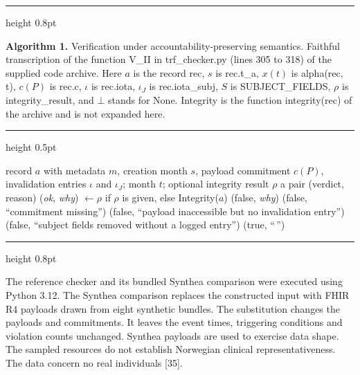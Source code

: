 \documentclass[5p,twocolumn]{elsarticle}
\newcommand{\algcapfont}{\footnotesize\linespread{1.05}\selectfont}
\begin{document}
\begin{algorithm*}[!tbp]
\captionsetup{justification=raggedright,singlelinecheck=false}
\hrule height 0.8pt\vspace{3pt}
{\algcapfont\raggedright \textbf{Algorithm 1.} Verification under accountability-preserving
semantics. Faithful transcription of the function V\_II in
trf\_checker.py (lines 305 to 318) of the supplied code archive. Here
\(a\) is the record rec, \(s\) is rec.t\_a, \(x(t)\) is alpha(rec, t),
\(c(P)\) is rec.c, \(\iota\) is rec.iota, \(\iota_J\) is rec.iota\_subj,
\(S\) is SUBJECT\_FIELDS, \(\rho\) is integrity\_result, and \(\bot\)
stands for None. Integrity is the function integrity(rec) of the archive
and is not expanded here.\par}
\vspace{2pt}\hrule height 0.5pt\vspace{3pt}
\small\linespread{1.05}\selectfont\begin{algorithmic}[1]
\Require record \(a\) with metadata \(m\), creation month \(s\), payload commitment \(c(P)\), invalidation entries \(\iota\) and \(\iota_J\); month \(t\); optional integrity result \(\rho\)
\Ensure a pair (verdict, reason)
\State (\emph{ok}, \emph{why}) \(\leftarrow \rho\) if \(\rho\) is given, else Integrity(\(a\))
\State \Return (false, \emph{why})
\EndIf
{}
\State \Return (false, ``commitment missing'')
\EndIf
{}
\State \Return (false, ``payload inaccessible but no invalidation entry'')
\EndIf
{}
\State \Return (false, ``subject fields removed without a logged entry'')
\EndIf
\State \Return (true, ``\,'')
\end{algorithmic}
\vspace{2pt}\hrule height 0.8pt
\end{algorithm*}

The reference checker and its bundled Synthea comparison were executed
using Python 3.12. The Synthea comparison replaces the constructed input
with FHIR R4 payloads drawn from eight synthetic bundles. The
substitution changes the payloads and commitments. It leaves the event
times, triggering conditions and violation counts unchanged. Synthea
payloads are used to exercise data shape. The sampled resources do not
establish Norwegian clinical representativeness. The data concern no
real individuals {[}35{]}.
\end{document}
